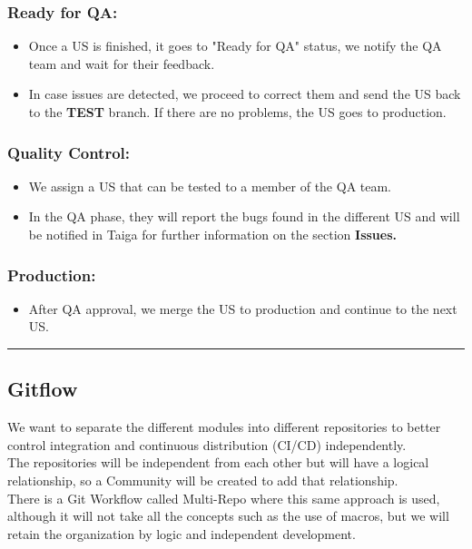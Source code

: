 \documentclass{article}
\providecommand{\tightlist}{
  \setlength{\itemsep}{0pt}\setlength{\parskip}{0pt}}
\begin{document}
\hypertarget{readyforqa}{
\subsubsection{Ready for QA:}\label{readyforqa}}

\begin{itemize}
\tightlist
\item
  Once a US is finished, it goes to "Ready for QA" status, we notify the
  QA team and wait for their feedback.
\item
  In case issues are detected, we proceed to correct them and send the
  US back to the \textbf{TEST} branch. If there are no problems, the US
  goes to production.
\end{itemize}

\hypertarget{qualitycontrolnbsp}{
\subsubsection{Quality Control:~}\label{qualitycontrolnbsp}}

\begin{itemize}
\tightlist
\item
  We assign a US that can be tested to a member of the QA team.
\item
  In the QA phase, they will report the bugs found in the different US
  and will be notified in Taiga for further information on the section
  \textbf{Issues.}
\end{itemize}

\hypertarget{productionnbsp}{
\subsubsection{Production:~}\label{productionnbsp}}

\begin{itemize}
\tightlist
\item
  After QA approval, we merge the US to production and continue to the
  next US.
\end{itemize}

\begin{center}\rule{0.5\linewidth}{0.5pt}\end{center}

\hypertarget{gitflow}{
\subsection{Gitflow}\label{gitflow}}

We want to separate the different modules into different repositories to
better control integration and continuous distribution (CI/CD)
independently.\\
The repositories will be independent from each other but will have a
logical relationship, so a Community will be created to add that
relationship.\\
There is a Git Workflow called Multi-Repo where this same approach is
used, although it will not take all the concepts such as the use of
macros, but we will retain the organization by logic and independent
development.~
\end{document}
